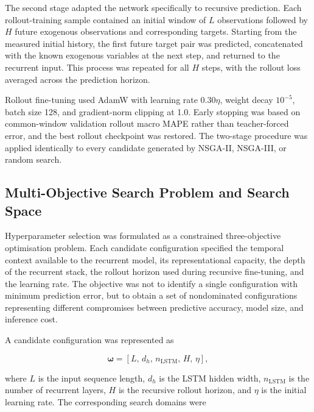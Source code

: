 \documentclass[a4paper,fleqn]{cas-sc}
\begin{document}
The second stage adapted the network specifically to recursive prediction. Each rollout-training sample contained an initial window of $L$ observations followed by $H$ future exogenous observations and corresponding targets. Starting from the measured initial history, the first future target pair was predicted, concatenated with the known exogenous variables at the next step, and returned to the recurrent input. This process was repeated for all $H$ steps, with the rollout loss averaged across the prediction horizon.

Rollout fine-tuning used AdamW with learning rate $0.30\eta$, weight decay $10^{-5}$, batch size 128, and gradient-norm clipping at 1.0. Early stopping was based on common-window validation rollout macro MAPE rather than teacher-forced error, and the best rollout checkpoint was restored. The two-stage procedure was applied identically to every candidate generated by NSGA-II, NSGA-III, or random search.


\subsection{Multi-Objective Search Problem and Search Space}
\label{sec:search_problem}

Hyperparameter selection was formulated as a constrained three-objective optimisation problem. Each candidate configuration specified the temporal context available to the recurrent model, its representational capacity, the depth of the recurrent stack, the rollout horizon used during recursive fine-tuning, and the learning rate. The objective was not to identify a single configuration with minimum prediction error, but to obtain a set of nondominated configurations representing different compromises between predictive accuracy, model size, and inference cost.

A candidate configuration was represented as

\begin{equation}
\boldsymbol{\omega}
=
\left[
L,\,
d_h,\,
n_{\mathrm{LSTM}},\,
H,\,
\eta
\right],
\label{eq:candidate_vector}
\end{equation}

where $L$ is the input sequence length, $d_h$ is the LSTM hidden width, $n_{\mathrm{LSTM}}$ is the number of recurrent layers, $H$ is the recursive rollout horizon, and $\eta$ is the initial learning rate. The corresponding search domains were
\end{document}
